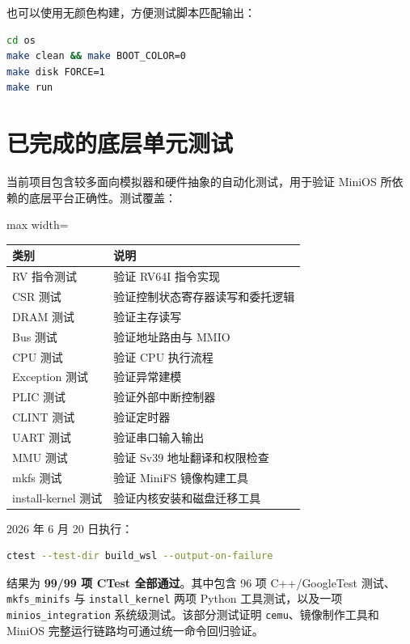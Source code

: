 \documentclass[UTF8,a4paper,12pt,openany,fontset=fandol]{ctexrep}
\begin{document}
也可以使用无颜色构建，方便测试脚本匹配输出：

\begin{lstlisting}[language=bash]
cd os
make clean && make BOOT_COLOR=0
make disk FORCE=1
make run
\end{lstlisting}

\section{已完成的底层单元测试}

当前项目包含较多面向模拟器和硬件抽象的自动化测试，用于验证 MiniOS 所依赖的底层平台正确性。测试覆盖：

\begin{table}[H]
\centering
\small
\begin{adjustbox}{max width=\textwidth}
\begin{tabularx}{\textwidth}{>{\raggedright\arraybackslash}X>{\raggedright\arraybackslash}X}
\toprule
\textbf{类别} & \textbf{说明} \\
\midrule
RV 指令测试 & 验证 RV64I 指令实现 \\
CSR 测试 & 验证控制状态寄存器读写和委托逻辑 \\
DRAM 测试 & 验证主存读写 \\
Bus 测试 & 验证地址路由与 MMIO \\
CPU 测试 & 验证 CPU 执行流程 \\
Exception 测试 & 验证异常建模 \\
PLIC 测试 & 验证外部中断控制器 \\
CLINT 测试 & 验证定时器 \\
UART 测试 & 验证串口输入输出 \\
MMU 测试 & 验证 Sv39 地址翻译和权限检查 \\
mkfs 测试 & 验证 MiniFS 镜像构建工具 \\
install-kernel 测试 & 验证内核安装和磁盘迁移工具 \\
\bottomrule
\end{tabularx}
\end{adjustbox}
\end{table}

2026 年 6 月 20 日执行：

\begin{lstlisting}[language=bash]
ctest --test-dir build_wsl --output-on-failure
\end{lstlisting}

结果为 \textbf{99/99 项 CTest 全部通过}。其中包含 96 项 C++/GoogleTest 测试、\nolinkurl{mkfs_minifs} 与 \nolinkurl{install_kernel} 两项 Python 工具测试，以及一项 \nolinkurl{minios_integration} 系统级测试。该部分测试证明 \nolinkurl{cemu}、镜像制作工具和 MiniOS 完整运行链路均可通过统一命令回归验证。
\end{document}
